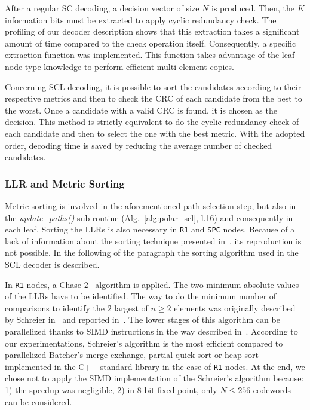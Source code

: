 After a regular SC decoding, a decision vector of size $N$ is produced. Then,
the $K$ information bits must be extracted to apply cyclic redundancy check. The
profiling of our decoder description shows that this extraction takes a
significant amount of time compared to the check operation itself. Consequently,
a specific extraction function was implemented. This function takes advantage of
the leaf node type knowledge to perform efficient multi-element copies.

Concerning SCL decoding, it is possible to sort the candidates according to
their respective metrics and then to check the CRC of each candidate from the
best to the worst. Once a candidate with a valid CRC is found, it is chosen as
the decision. This method is strictly equivalent to do the cyclic redundancy
check of each candidate and then to select the one with the best metric. With
the adopted order, decoding time is saved by reducing the average number of
checked candidates.

\subsubsection{LLR and Metric Sorting}
\label{sec:polar_sorting}

Metric sorting is involved in the aforementioned path selection step, but also
in the \textit{update\_paths()} sub-routine (Alg.~\ref{alg:polar_scl}, l.16) and
consequently in each leaf. Sorting the LLRs is also necessary in \verb|R1| and
\verb|SPC| nodes. Because of a lack of information about the sorting technique
presented in~\cite{Sarkis2016}, its reproduction is not possible. In the
following of the paragraph the sorting algorithm used in the SCL decoder is
described.

In \verb|R1| nodes, a Chase-$2$~\cite{Chase1972} algorithm is applied. The two
minimum absolute values of the LLRs have to be identified. The way to do the
minimum number of comparisons to identify the $2$ largest of $n\geq2$ elements
was originally described by Schreier in~\cite{Schreier1932} and reported
in~\cite{Knuth1973}. The lower stages of this algorithm can be parallelized
thanks to SIMD instructions in the way described in~\cite{Furtak2007}. According
to our experimentations, Schreier's algorithm is the most efficient compared to
parallelized Batcher's merge exchange, partial quick-sort or heap-sort
implemented in the C++ standard library in the case of \verb|R1| nodes. At the
end, we chose not to apply the SIMD implementation of the Schreier's algorithm
because: 1) the speedup was negligible, 2) in 8-bit fixed-point, only
$N \leq 256$ codewords can be considered.

